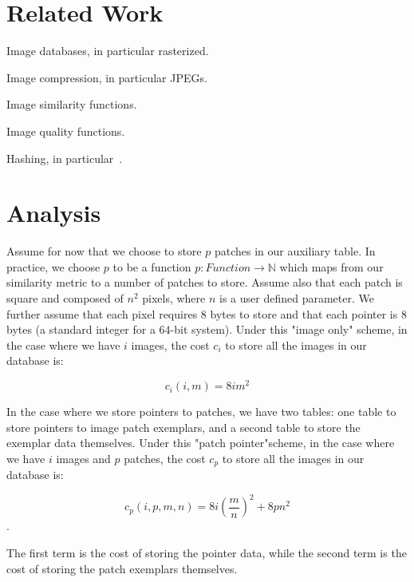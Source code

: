 \documentclass{vldb}
\begin{document}
\section{Related Work}\label{sec:related}

Image databases, in particular rasterized.

Image compression, in particular JPEGs.

Image similarity functions.

Image quality functions.

Hashing, in particular~\cite{LSH:Andoni}.

\section{Analysis}
Assume for now that we choose to store $p$ patches in our auxiliary table.  In practice, we choose $p$ to be a function $p \colon Function \to \mathds{N}$ which maps from our similarity metric to a number of patches to store.  Assume also that each patch is square and composed of $n^2$ pixels, where $n$ is a user defined parameter.  We further assume that each pixel requires 8 bytes to store  and that each pointer is 8 bytes (a standard integer for a 64-bit system).  Under this "image only" scheme, in the case where we have $i$ images, the cost $c_i$ to store all the images in our database is:

\begin{equation}
	c_i(i, m) = 8  i  m^2
\end{equation}

In the case where we store pointers to patches, we have two tables: one table to store pointers to image patch exemplars, and a second table to store the exemplar data themselves.  Under this "patch pointer"scheme, in the case where we have $i$ images and $p$ patches, the cost $c_p$ to store all the images in our database is:

\begin{equation}
	c_p(i, p, m, n) = 8 i (\frac{m}{n})^2 + 8  p  n^2
\end{equation}.

The first term is the cost of storing the pointer data, while the second term is the cost of storing the patch exemplars themselves.




%



\end{document}
